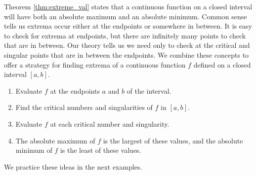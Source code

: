 Theorem \ref{thm:extreme_val} states that a continuous function on a closed interval will have both an absolute maximum and an absolute minimum. Common sense tells us extrema occur either at the endpoints or somewhere in between. It is easy to check for extrema at endpoints, but there are infinitely many points to check that are in between. Our theory tells us we need only to check at the critical and singular points that are in between the endpoints. We combine these concepts to offer a strategy for finding extrema of a continuous function $f$ defined on a closed interval $[a,b]$. 
	\begin{enumerate}
	\item		Evaluate $f$ at the endpoints $a$ and $b$ of the interval.
	\item		Find the critical numbers and singularities of $f$ in $[a,b]$.
	\item		Evaluate $f$ at each critical number and singularity.
	\item		The absolute maximum of $f$ is the largest of these values, and the absolute minimum of $f$ is the least of these values.
	\end{enumerate}


We practice these ideas in the next examples.

